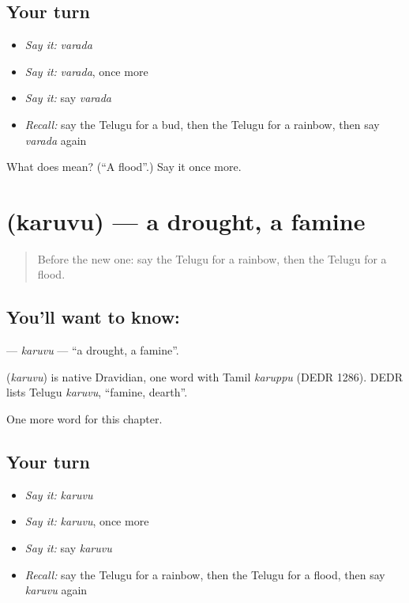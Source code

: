 \subsection*{Your turn}
\begin{itemize}
\raggedright
  \item \emph{Say it:} \emph{varada}
  \item \emph{Say it:} \emph{varada}, once more
  \item \emph{Say it:} say \emph{varada}
  \item \emph{Recall:} say the Telugu for a bud, then the Telugu for a rainbow, then say \emph{varada} again
\end{itemize}

\begin{tcolorbox}[breakable,colback=teal!4,colframe=teal!35!black,title={Before you move on}]
What does  mean? (\textquotedblleft{}A flood\textquotedblright{}.) Say it once more.
\end{tcolorbox}
\section[\texorpdfstring{\te{కరువు} (karuvu)}{కరువు (karuvu)}]{ (karuvu) — a drought, a famine}

\label{lesson:TE-C267-karuvu}



\begin{quote}
Before the new one: say the Telugu for a rainbow, then the Telugu for a flood.
\end{quote}

\subsection*{You'll want to know: }
\textbf{} — \emph{karuvu} — \textquotedblleft{}a drought, a famine\textquotedblright{}.

\begin{cousinweb}
\textbf{} (\emph{karuvu}) is native Dravidian, one word with Tamil \emph{karuppu} (DEDR 1286). DEDR lists Telugu \emph{karuvu}, \textquotedblleft{}famine, dearth\textquotedblright{}.
\end{cousinweb}

\begin{grammarlens}[title={What you've built}]
One more word for this chapter.
\end{grammarlens}

\subsection*{Your turn}
\begin{itemize}
\raggedright
  \item \emph{Say it:} \emph{karuvu}
  \item \emph{Say it:} \emph{karuvu}, once more
  \item \emph{Say it:} say \emph{karuvu}
  \item \emph{Recall:} say the Telugu for a rainbow, then the Telugu for a flood, then say \emph{karuvu} again
\end{itemize}

